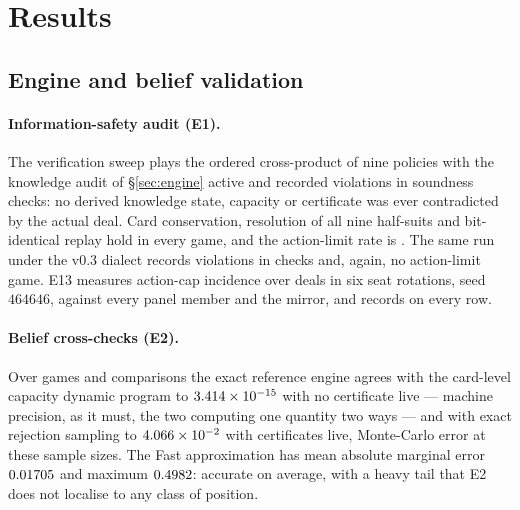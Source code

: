 \section{Results}
\label{sec:results}

\renewcommand{\topfraction}{0.92}
\renewcommand{\bottomfraction}{0.75}
\renewcommand{\textfraction}{0.06}
\renewcommand{\floatpagefraction}{0.80}
\setcounter{topnumber}{3}
\setcounter{bottomnumber}{2}
\setcounter{totalnumber}{4}
\setlength{\textfloatsep}{12pt plus 2pt minus 4pt}
\setlength{\floatsep}{10pt plus 2pt minus 3pt}
\setlength{\intextsep}{12pt plus 2pt minus 3pt}

\subsection{Engine and belief validation}
\label{sec:results-verify}

\paragraph{Information-safety audit (E1).}
The verification sweep plays the ordered cross-product of nine policies with the
knowledge audit of \S\ref{sec:engine} active and recorded \numAuditViolations{}
violations in \numAuditChecks{} soundness checks: no derived knowledge state,
capacity or certificate was ever contradicted by the actual deal. Card
conservation, resolution of all nine half-suits and bit-identical replay hold in
every game, and the action-limit rate is \numLimitRate{}. The same run under the
v0.3 dialect records \numAuditViolations{} violations in \numAuditChecksLegacy{}
checks and, again, no action-limit game. E13 measures action-cap incidence over
\numEthirteenDeals{} deals in six seat rotations, seed $464646$, against every
panel member and the \vfast{} mirror, and records \numLimitRate{} on every row.

\paragraph{Belief cross-checks (E2).}
Over \numSelftestGames{} games and \numSelftestChecks{} comparisons the exact
reference engine agrees with the card-level capacity dynamic program to
$3.414\times 10^{-15}$ with no certificate live --- machine precision, as it must,
the two computing one quantity two ways --- and with exact rejection sampling to
$4.066\times 10^{-2}$ with certificates live, Monte-Carlo error at these sample
sizes. The Fast approximation has mean absolute marginal error $0.01705$
and maximum $0.4982$: accurate on average, with a heavy tail that E2
does not localise to any class of position.

